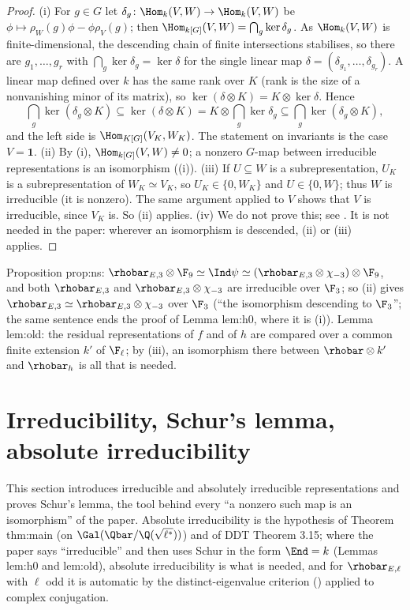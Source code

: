 \begin{proof}
(i) For $g\in G$ let $\delta_g\colon\Hom_k(V,W)\to\Hom_k(V,W)$ be $\phi\mapsto\rho_W(g)\phi-\phi\rho_V(g)$; then $\Hom_{k[G]}(V,W)=\bigcap_g\ker\delta_g$. As
$\Hom_k(V,W)$ is finite-dimensional, the descending chain of finite intersections stabilises, so there are $g_1,\dots,g_r$ with
$\bigcap_g\ker\delta_g=\ker\delta$ for the single linear map $\delta=(\delta_{g_1},\dots,\delta_{g_r})$. A linear map defined over $k$ has the same rank
over $K$ (rank is the size of a nonvanishing minor of its matrix), so $\ker(\delta\otimes K)=K\otimes\ker\delta$. Hence
\[
\textstyle\bigcap_g\ker(\delta_g\otimes K)\subseteq\ker(\delta\otimes K)=K\otimes\bigcap_g\ker\delta_g\subseteq\bigcap_g\ker(\delta_g\otimes K),
\]
and the left side is $\Hom_{K[G]}(V_K,W_K)$. The statement on invariants is the case $V=\mathbf1$.
(ii) By (i), $\Hom_{k[G]}(V,W)\ne0$; a nonzero $G$-map between irreducible representations is an isomorphism ((i)).
(iii) If $U\subseteq W$ is a subrepresentation, $U_K$ is a subrepresentation of $W_K\simeq V_K$, so $U_K\in\{0,W_K\}$ and $U\in\{0,W\}$; thus $W$
is irreducible (it is nonzero). The same argument applied to $V$ shows that $V$ is irreducible, since $V_K$ is. So (ii) applies.
(iv) We do not prove this; see \cite[Section 29]{CurtisReiner}. It is not needed in the paper: wherever an isomorphism is descended,
(ii) or (iii) applies.
\end{proof}

\begin{paperlink}
Proposition prop:ns: $\rhobar_{E,3}\otimes\F_9\simeq\Ind\psi\simeq(\rhobar_{E,3}\otimes\chi_{-3})\otimes\F_9$, and both $\rhobar_{E,3}$ and $\rhobar_{E,3}\otimes\chi_{-3}$ are irreducible
over $\F_3$; so (ii) gives $\rhobar_{E,3}\simeq\rhobar_{E,3}\otimes\chi_{-3}$ over $\F_3$ (``the isomorphism descending to $\F_3$''; the same sentence ends the
proof of Lemma lem:h0, where it is (i)). Lemma lem:old: the residual representations of $f$ and of $h$ are compared over a common finite
extension $k'$ of $\F_\ell$; by (iii), an isomorphism there between $\rhobar\otimes k'$ and $\rhobar_h$ is all that is needed.
\end{paperlink}

\section{Irreducibility, Schur's lemma, absolute irreducibility}\label{sec:reps:irreducible}

This section introduces irreducible and absolutely irreducible representations and proves Schur's lemma, the tool behind
every ``a nonzero such map is an isomorphism'' of the paper. Absolute irreducibility is the hypothesis of Theorem thm:main (on
$\Gal(\Qbar/\Q(\sqrt{\ell^*}))$) and of DDT Theorem 3.15; where the paper says ``irreducible'' and then uses Schur in the form $\End=k$
(Lemmas lem:h0 and lem:old), absolute irreducibility is what is needed, and for $\rhobar_{E,\ell}$ with $\ell$ odd it is automatic by the
distinct-eigenvalue criterion () applied to complex conjugation.

